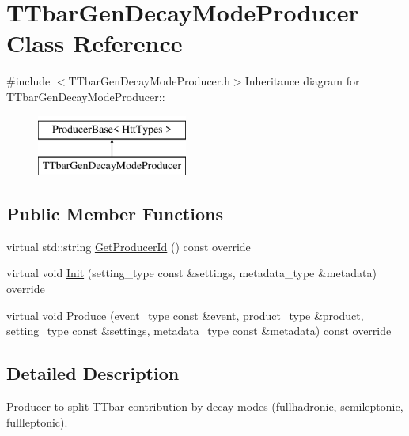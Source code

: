 \hypertarget{classTTbarGenDecayModeProducer}{
\section{TTbarGenDecayModeProducer Class Reference}
\label{classTTbarGenDecayModeProducer}
}


{\ttfamily \#include $<$TTbarGenDecayModeProducer.h$>$}Inheritance diagram for TTbarGenDecayModeProducer::\begin{figure}[H]
\begin{center}
\leavevmode
\includegraphics[height=2cm]{classTTbarGenDecayModeProducer}
\end{center}
\end{figure}
\subsection*{Public Member Functions}
\begin{DoxyCompactItemize}
\item 
virtual std::string \hyperlink{classTTbarGenDecayModeProducer_a2298efdb359439c224848aca0cf26a97}{GetProducerId} () const override
\item 
virtual void \hyperlink{classTTbarGenDecayModeProducer_afe7766ec9a39ece78056c90a9aeefeb3}{Init} (setting\_\-type const \&settings, metadata\_\-type \&metadata) override
\item 
virtual void \hyperlink{classTTbarGenDecayModeProducer_a1421a1e8afc50c77757d4e4a4a5f1bc8}{Produce} (event\_\-type const \&event, product\_\-type \&product, setting\_\-type const \&settings, metadata\_\-type const \&metadata) const override
\end{DoxyCompactItemize}


\subsection{Detailed Description}
Producer to split TTbar contribution by decay modes (fullhadronic, semileptonic, fullleptonic). 

